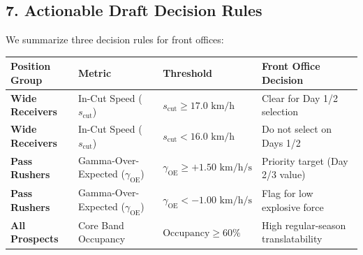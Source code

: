 \documentclass[
  letterpaper,
  DIV=11,
  numbers=noendperiod]{scrartcl}
\newcounter{none} %
\begin{document}
\subsection{7. Actionable Draft Decision
Rules}\label{actionable-draft-decision-rules}

We summarize three decision rules for front offices:

{\def\LTcaptype{none} %
\begin{longtable}[]{@{}
  >{\raggedright\arraybackslash}p{}
  >{\raggedright\arraybackslash}p{}
  >{\raggedright\arraybackslash}p{}
  >{\raggedright\arraybackslash}p{}@{}}
\toprule\noalign{}
\begin{minipage}[b]{\linewidth}\raggedright
Position Group
\end{minipage} & \begin{minipage}[b]{\linewidth}\raggedright
Metric
\end{minipage} & \begin{minipage}[b]{\linewidth}\raggedright
Threshold
\end{minipage} & \begin{minipage}[b]{\linewidth}\raggedright
Front Office Decision
\end{minipage} \\
\midrule\noalign{}
\endhead
\bottomrule\noalign{}
\endlastfoot
\textbf{Wide Receivers} & In-Cut Speed (\(s_{\text{cut}}\)) &
\(s_{\text{cut}} \ge 17.0\text{ km/h}\) & Clear for Day 1/2 selection \\
\textbf{Wide Receivers} & In-Cut Speed (\(s_{\text{cut}}\)) &
\(s_{\text{cut}} < 16.0\text{ km/h}\) & Do not select on Days 1/2 \\
\textbf{Pass Rushers} & Gamma-Over-Expected (\(\gamma_{\text{OE}}\)) &
\(\gamma_{\text{OE}} \ge +1.50\text{ km/h/s}\) & Priority target (Day
2/3 value) \\
\textbf{Pass Rushers} & Gamma-Over-Expected (\(\gamma_{\text{OE}}\)) &
\(\gamma_{\text{OE}} < -1.00\text{ km/h/s}\) & Flag for low explosive
force \\
\textbf{All Prospects} & Core Band Occupancy &
\(\text{Occupancy} \ge 60\%\) & High regular-season translatability \\
\end{longtable}
}
\end{document}
